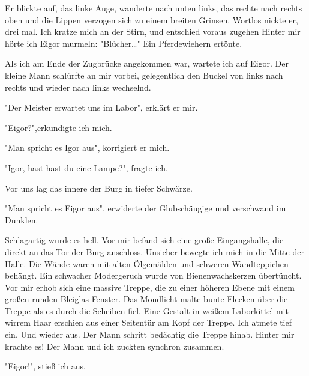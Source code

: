 \documentclass[ebook]{article}
\begin{document}
Er blickte auf, das linke Auge, wanderte nach unten links, das
rechte nach rechts oben und die Lippen verzogen sich zu einem
breiten Grinsen. Wortlos nickte er, drei mal. Ich kratze mich an der
Stirn, und entschied voraus zugehen Hinter mir hörte ich Eigor
murmeln: "Blücher\ldots{}" Ein Pferdewiehern ertönte.

\noindent Als ich am Ende der Zugbrücke angekommen war, wartete ich
auf Eigor. Der kleine Mann schlürfte an mir vorbei, gelegentlich den
Buckel von links nach rechts und wieder nach links wechselnd.

\begin{center}
"Der Meister erwartet uns im Labor", erklärt er mir.
\end{center}

\begin{center}
"Eigor?",erkundigte ich mich.
\end{center}

\begin{center}
"Man spricht es Igor aus", korrigiert er mich.
\end{center}

\begin{center}
"Igor, hast hast du eine Lampe?", fragte ich.
\end{center}

\noindent Vor uns lag das innere der Burg in tiefer Schwärze.

\begin{center}
"Man spricht es Eigor aus", erwiderte der Glubschäugige und
verschwand im Dunklen.
\end{center}

\noindent Schlagartig wurde es hell. Vor mir befand sich eine große
Eingangshalle, die direkt an das Tor der Burg anschloss. Unsicher
bewegte ich mich in die Mitte der Halle. Die Wände waren mit alten
Ölgemälden und schweren Wandteppichen behängt. Ein schwacher
Modergeruch wurde von Bienenwachskerzen übertüncht. Vor mir erhob
sich eine massive Treppe, die zu einer höheren Ebene mit einem großen
runden Bleiglas Fenster. Das Mondlicht malte bunte Flecken über die
Treppe als es durch die Scheiben fiel. Eine Gestalt in weißem
Laborkittel mit wirrem Haar erschien aus einer Seitentür am Kopf der
Treppe. Ich atmete tief ein. Und wieder aus. Der Mann schritt
bedächtig die Treppe hinab. Hinter mir krachte es! Der Mann und ich
zuckten synchron zusammen.

\begin{center}
"Eigor!", stieß ich aus.
\end{center}
\end{document}
